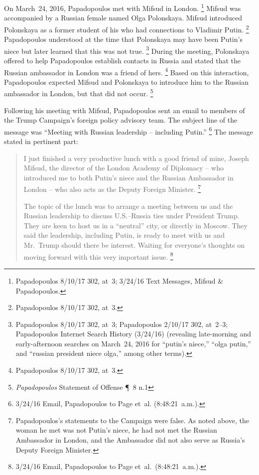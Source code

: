On March~24, 2016, Papadopoulos met with Mifsud in London.%
\footnote{Papadopoulos 8/10/17 302, at~3; 3/24/16 Text Messages, Mifsud \& Papadopoulos.}
Mifsud was accompanied by a Russian female named Olga Polonskaya.
Mifsud introduced Polonskaya as a former student of his who had connections to Vladimir Putin.%
\footnote{Papadopoulos 8/10/17 302, at~3.}
Papadopoulos understood at the time that Polonskaya may have been Putin's niece but later learned that this was not true.%
\footnote{Papadopoulos 8/10/17 302, at~3;
Papadopoulos 2/10/17 302, at~2--3;
Papadopoulos Internet Search History (3/24/16) (revealing late-morning and early-afternoon searches on March~24, 2016 for ``putin's niece,'' ``olga putin,'' and ``russian president niece olga,'' among other terms).}
During the meeting, Polonskaya offered to help Papadopoulos establish contacts in Russia and stated that the Russian ambassador in London was a friend of hers.%
\footnote{Papadopoulos 8/10/17 302, at~3.}
Based on this interaction, Papadopoulos expected Mifsud and Polonskaya to introduce him to the Russian ambassador in London, but that did not occur.%
\footnote{\textit{Papadopoulos} Statement of Offense \P~8 n.1}

Following his meeting with Mifsud, Papadopoulos sent an email to members of the Trump Campaign's foreign policy advisory team. The subject line of the message was ``Meeting with Russian leadership -- including Putin.''%
\footnote{3/24/16 Email, Papadopoulos to Page et~al. (8:48:21~a.m.).}
The message stated in pertinent part:

\begin{quote}
I just finished a very productive lunch with a good friend of mine, Joseph Mifsud, the director of the London Academy of Diplomacy -- who introduced me to both Putin's niece and the Russian Ambassador in London -- who also acts as the Deputy Foreign Minister.%
\footnote{Papadopoulos's statements to the Campaign were false.
As noted above, the woman he met was not Putin's niece, he had not met the Russian Ambassador in London, and the Ambassador did not also serve as Russia's Deputy Foreign Minister.}

The topic of the lunch was to arrange a meeting between us and the Russian leadership to discuss U.S.--Russia ties under President Trump.
They are keen to host us in a ``neutral'' city, or directly in Moscow.
They said the leadership, including Putin, is ready to meet with us and Mr.~Trump should there be interest.
Waiting for everyone's thoughts on moving forward with this very important issue.%
\footnote{3/24/16 Email, Papadopoulos to Page et~al.\ (8:48:21~a.m.).}
\end{quote}

